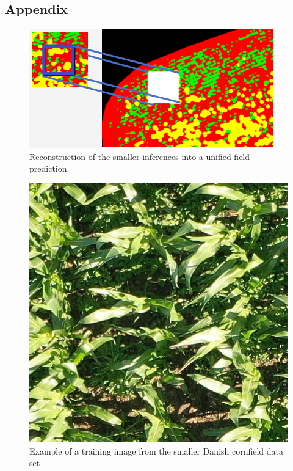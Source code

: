 \documentclass{article}
\begin{document}


\subsection{Appendix}
\begin{figure}[h!]
	\centering
	\includegraphics[width=0.7\linewidth]{"reconstruction DL"}
	\caption{Reconstruction of the smaller inferences into a unified field prediction.}
	\label{reconstruction_technique}
\end{figure}

\begin{figure}[h!]
	\centering
	\includegraphics[width=0.7\linewidth]{"corn.JPG"}
	\caption{Example of a training image from the smaller Danish cornfield data set}
	\label{fig:corn}
\end{figure}
\end{document}
